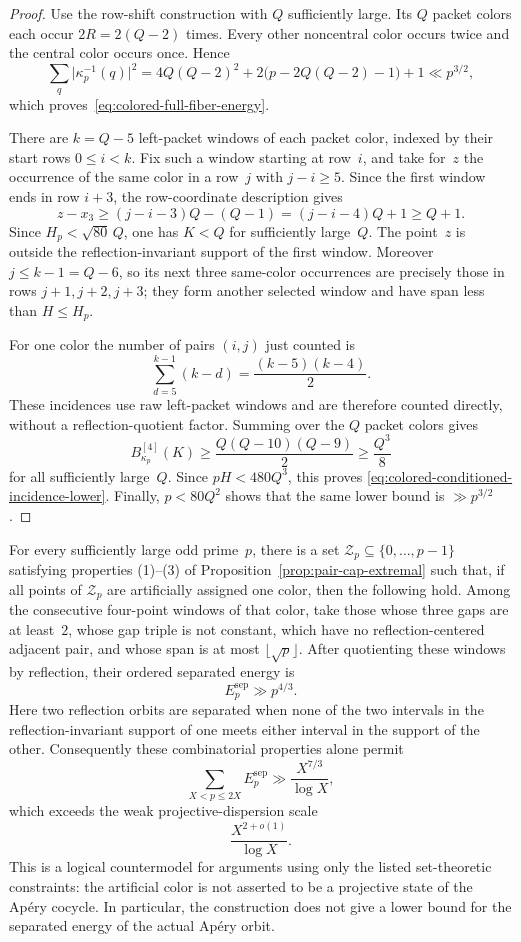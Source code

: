 \begin{proof}
Use the row-shift construction with $Q$ sufficiently large.  Its $Q$
packet colors each occur $2R=2(Q-2)$ times.  Every other noncentral color
occurs twice and the central color occurs once.  Hence
\[
 \sum_q\bigl|\kappa_p^{-1}(q)\bigr|^2
 =4Q(Q-2)^2+2\bigl(p-2Q(Q-2)-1\bigr)+1
 \ll p^{3/2},
\]
which proves~\eqref{eq:colored-full-fiber-energy}.

There are $k=Q-5$ left-packet windows of each packet color, indexed by
their start rows $0\le i<k$.  Fix such a window starting at row~$i$, and
take for~$z$ the occurrence of the same color in a row~$j$ with
$j-i\ge5$.  Since the first window ends in row $i+3$, the row-coordinate
description gives
\[
 z-x_3
 \ge (j-i-3)Q-(Q-1)
 =(j-i-4)Q+1\ge Q+1.
\]
Since $H_p<\sqrt{80}\,Q$, one has $K<Q$ for sufficiently large~$Q$.
The point~$z$ is outside the reflection-invariant support of the
first window.  Moreover $j\le k-1=Q-6$, so its next three same-color
occurrences are precisely those in rows $j+1,j+2,j+3$; they form another
selected window and have span less than $H\le H_p$.

For one color the number of pairs $(i,j)$ just counted is
\[
 \sum_{d=5}^{k-1}(k-d)=\frac{(k-5)(k-4)}2.
\]
These incidences use raw left-packet windows and are therefore counted
directly, without a reflection-quotient factor.  Summing over the $Q$
packet colors gives
\[
 B_{\kappa_p}^{[4]}(K)
 \ge\frac{Q(Q-10)(Q-9)}2
 \ge\frac{Q^3}{8}
\]
for all sufficiently large~$Q$.  Since $pH<480Q^3$, this proves
\eqref{eq:colored-conditioned-incidence-lower}.  Finally,
$p<80Q^2$ shows that the same lower bound is $\gg p^{3/2}$.
\end{proof}

\begin{corollary}
\label{cor:pair-cap-separated-energy}
For every sufficiently large odd prime~$p$, there is a set
$\mathcal Z_p\subseteq\{0,\ldots,p-1\}$ satisfying properties
\textnormal{(1)--(3)} of Proposition~\ref{prop:pair-cap-extremal} such that,
if all points of $\mathcal Z_p$ are artificially assigned one color, then
the following hold.  Among the consecutive four-point windows of that color,
take those
whose three gaps are at least~$2$, whose gap triple is not constant, which
have no reflection-centered adjacent pair, and whose span is at most
$\lfloor\sqrt p\rfloor$.  After quotienting these windows by reflection,
their ordered separated energy is
\[
 E_p^{\mathrm{sep}}\gg p^{4/3}.
\]
Here two reflection orbits are separated when none of the two intervals in
the reflection-invariant support of one meets either interval in the support
of the other.  Consequently these combinatorial properties alone permit
\[
 \sum_{X<p\le2X}E_p^{\mathrm{sep}}
 \gg\frac{X^{7/3}}{\log X},
\]
which exceeds the weak projective-dispersion scale
\[
\frac{X^{2+o(1)}}{\log X}.
\]
This is a logical countermodel for arguments using only the listed
set-theoretic constraints: the artificial color is not asserted to be a
projective state of the Ap\'ery cocycle.  In particular, the construction
does not give a lower bound for the separated energy of the actual Ap\'ery
orbit.
\end{corollary}

